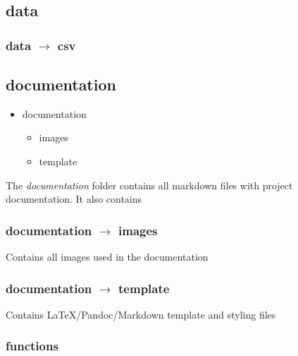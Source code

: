 \documentclass[]{book}
\providecommand{\tightlist}{%
  \setlength{\itemsep}{0pt}\setlength{\parskip}{0pt}}
\begin{document}
\subsection{data}\label{data}

\subsubsection{\texorpdfstring{data \(\rightarrow\)
csv}{data \textbackslash{}rightarrow csv}}\label{data-rightarrow-csv}

\subsection{documentation}\label{documentation}

\begin{itemize}
\tightlist
\item
  documentation

  \begin{itemize}
  \tightlist
  \item
    images
  \item
    template
  \end{itemize}
\end{itemize}

The \emph{documentation} folder contains all markdown files with project
documentation. It also contains

\subsubsection{\texorpdfstring{documentation \(\rightarrow\)
images}{documentation \textbackslash{}rightarrow images}}\label{documentation-rightarrow-images}

Contains all images used in the documentation

\subsubsection{\texorpdfstring{documentation \(\rightarrow\)
template}{documentation \textbackslash{}rightarrow template}}\label{documentation-rightarrow-template}

Contains LaTeX/Pandoc/Markdown template and styling files

\subsubsection{functions}\label{functions}
\end{document}
